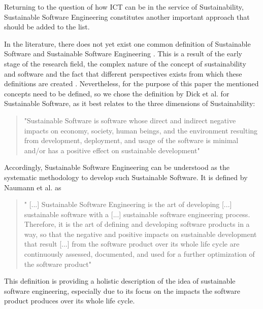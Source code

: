 \documentclass[oribibl]{llncs}
\begin{document}
Returning to the question of how ICT can be in the service of Sustainability, Sustainable Software Engineering constitutes another important approach that should be added to the list.  

In the literature, there does not yet exist one common definition of Sustainable Software and Sustainable Software Engineering \cite{venters_software_2014}. This is a result of the early stage of the research field, the complex nature of the concept of sustainability and software and the fact that different perspectives exists from which these definitions are created \cite{venters_software_2014}. Nevertheless, for the purpose of this paper the mentioned concepts need to be defined, so we %
chose the definition by Dick et al. \cite{dick_model_2010} for Sustainable Software, as it best relates to the three dimensions of Sustainability: %
\begin{quote}
	"Sustainable Software is software whose direct and indirect negative impacts on economy, society, human beings, and the environment resulting from development, deployment, and usage of the software is minimal and/or has a positive effect on sustainable development" \cite{dick_model_2010}
\end{quote}
Accordingly, Sustainable Software Engineering can be understood as the systematic methodology to develop such Sustainable Software. It is defined by Naumann et al. as
\begin{quote}
	" [...] Sustainable Software Engineering is the art of developing [...] sustainable software with a [...] sustainable software engineering process. Therefore, it is the art of defining and developing software products in a way, so that the negative and positive impacts on sustainable development that result [...] from the software product over its whole life cycle are continuously assessed, documented, and used for a further optimization of the software product" \cite{naumann_greensoft_2011} %
\end{quote}
This definition is providing a holistic description of the idea of sustainable software engineering, especially due to its focus on the impacts the software product produces over its whole life cycle. %
\end{document}
